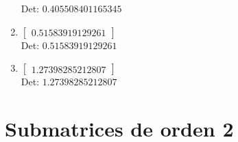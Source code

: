 \documentclass[12pt]{article}
\begin{document}
\begin{enumerate}
Det: $0.405508401165345$\\

\item $\displaystyle \left[\begin{matrix}0.51583919129261\end{matrix}\right]$\\

Det: $0.51583919129261$\\

\item $\displaystyle \left[\begin{matrix}1.27398285212807\end{matrix}\right]$\\

Det: $1.27398285212807$\\

\end{enumerate}


\section*{Submatrices de orden 2}
\end{document}

